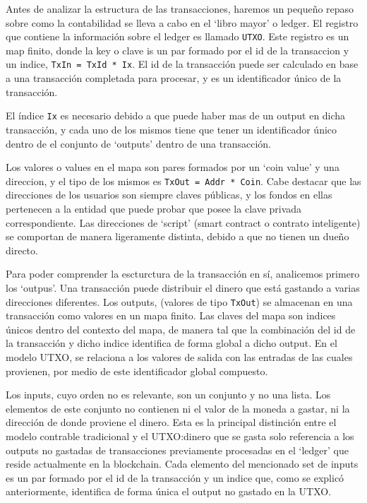 \documentclass[12pt]{book}
\begin{document}
Antes de analizar la estructura de las transacciones, haremos un pequeño repaso sobre como la contabilidad se lleva a cabo en el `libro mayor' o ledger. El registro que contiene la información sobre el ledger es llamado \texttt{UTXO}. Este registro es un map finito, donde la key o clave is un par formado por el id de la transaccion y un indice, \texttt{TxIn = TxId * Ix}. El id de la transacción puede ser calculado en base a una transacción completada para procesar, y es un identificador único de la transacción.

El índice \texttt{Ix} es necesario debido a que puede haber mas de un output en dicha transacción, y cada uno de los mismos tiene que tener un identificador único dentro de el conjunto de `outputs' dentro de una transacción.

Los valores o values en el mapa son pares formados por un `coin value' y una direccion, y el tipo de los mismos es \texttt{TxOut = Addr * Coin}. Cabe destacar que las direcciones de los usuarios son siempre claves públicas, y los fondos en ellas pertenecen a la entidad que puede probar que posee la clave privada correspondiente. Las direcciones de `script' (smart contract o contrato inteligente) se comportan de manera ligeramente distinta, debido a que no tienen un dueño directo.

Para poder comprender la escturctura de la transacción en sí, analicemos primero los `outpus'. Una transacción puede distribuir el dinero que está gastando a varias direcciones diferentes. Los outputs, (valores de tipo \texttt{TxOut}) se almacenan en una transacción como valores en un mapa finito.
Las claves del mapa son indices únicos dentro del contexto del mapa, de manera tal que la combinación del id de la transacción y dicho indice identifica de forma global a dicho output.
En el modelo UTXO, se relaciona a los valores de salida con las entradas de las cuales provienen, por medio de este identificador global compuesto.


Los inputs, cuyo orden no es relevante, son un conjunto y no una lista. Los elementos de este conjunto no contienen ni el valor de la moneda a gastar, ni la dirección de donde proviene el dinero. Esta es la principal distinción entre el modelo contrable tradicional y el UTXO:\@el dinero que se gasta solo referencia a los outputs no gastadas de transacciones previamente procesadas en el `ledger' que reside actualmente en la blockchain. Cada elemento del mencionado set de inputs es un par formado por el id de la transacción y un indice que, como se explicó anteriormente, identifica de forma única el output no gastado en la UTXO.\@
\end{document}

